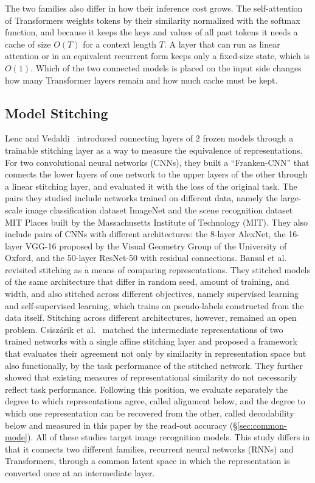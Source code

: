 \documentclass[conference]{IEEEtran}
\begin{document}
The two families also differ in how their inference cost grows. The self-attention of Transformers weights tokens by their
similarity normalized with the softmax function, and because it keeps the keys and values of all past tokens it needs a cache of
size $O(T)$ for a context length $T$. A layer that can run as linear attention or in an equivalent recurrent form keeps only a
fixed-size state, which is $O(1)$. Which of the two connected models is placed on the input side changes how many Transformer
layers remain and how much cache must be kept.

\subsection{Model Stitching}
Lenc and Vedaldi~\cite{10.1007/s11263-018-1098-y} introduced connecting layers of $2$ frozen models through a trainable stitching
layer as a way to measure the equivalence of representations. For two convolutional neural networks (CNNs), they built a
``Franken-CNN'' that connects the lower layers of one network to the upper layers of the other through a linear stitching layer, and
evaluated it with the loss of the original task. The pairs they studied include networks trained on different data, namely the
large-scale image classification dataset ImageNet and the scene recognition dataset MIT Places built by the Massachusetts Institute
of Technology (MIT). They also include pairs of CNNs with different architectures: the 8-layer AlexNet, the 16-layer VGG-16 proposed by the
Visual Geometry Group of the University of Oxford, and the 50-layer ResNet-50 with residual connections.
Bansal et al.~\cite{3540261.3540279} revisited stitching as a means of comparing representations. They stitched models of the same
architecture that differ in random seed, amount of training, and width, and also stitched across different objectives, namely
supervised learning and self-supervised learning, which trains on pseudo-labels constructed from the data itself. Stitching across
different architectures, however, remained an open problem. Csisz\'arik et al.~\cite{NEURIPS2021_2cb274e6} matched the intermediate
representations of two trained networks with a single affine stitching layer and proposed a framework that evaluates their agreement
not only by similarity in representation space but also functionally, by the task performance of the stitched network. They further
showed that existing measures of representational similarity do not necessarily reflect task performance. Following this position,
we evaluate separately the degree to which representations agree, called alignment below, and the degree to which one representation
can be recovered from the other, called decodability below and measured in this paper by the read-out accuracy
(\S\ref{sec:common-mode}). All of these studies target image recognition models. This study differs in that it connects two
different families, recurrent neural networks (RNNs) and Transformers, through a common latent space in which the representation is
converted once at an intermediate layer.
\end{document}
